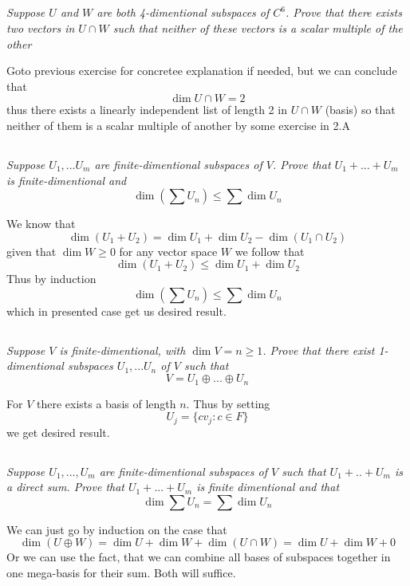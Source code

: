 \documentclass[11pt,oneside,titlepage]{book}
\begin{document}
\subsection{}
\textit{Suppose $U$ and $W$ are both 4-dimentional subspaces of $C^6$. Prove
  that there exists two vectors in $U \cap W$ such that neither of these
  vectors is a scalar multiple of the other}

Goto previous exercise for concretee explanation if needed, but  we can 
conclude that
$$\dim U \cap W = 2$$
thus there exists a linearly independent list of length 2 in $U \cap W$ (basis)
so that neither of them is a scalar multiple of another by some exercise in 2.A

\subsection{}
\textit{Suppose $U_1, ... U_m$ are finite-dimentional subspaces of $V$.
  Prove that $U_1 + ... + U_m$ is finite-dimentional and }
$$\dim(\sum U_n) \leq \sum{\dim U_n}$$

We know that 
$$\dim (U_1 + U_2) = \dim U_1 + \dim U_2 - \dim (U_1 \cap U_2)$$
given that $\dim W \geq 0$ for any vector space $W$ we follow that
$$\dim (U_1 + U_2) \leq \dim U_1 + \dim U_2$$
Thus by induction
$$\dim(\sum U_n) \leq  \sum \dim U_n $$
which in presented case get us desired result.

\subsection{}
\textit{Suppose $V$ is finite-dimentional, with $\dim V = n \geq 1$. Prove
  that there exist 1-dimentional subspaces $U_1, ... U_n$ of $V$ such that  
}
$$V = U_1 \oplus ... \oplus U_n$$

For $V$ there exists a basis of length $n$. Thus by setting
$$U_j = \{c v_j: c \in F\}$$
we get desired result.

\subsection{}
\textit{Suppose $U_1, ..., U_m$ are finite-dimentional subspaces of $V$ such
  that $U_1 + .. + U_m$ is a direct sum. Prove that $U_1 + ... + U_m$ is
  finite dimentional and that}
$$\dim \sum U_n = \sum \dim U_n$$

We can just go by induction on the case that
$$\dim (U \oplus W) = \dim U + \dim W + \dim (U \cap W) =
\dim U + \dim W + 0$$
Or we can use the fact, that we can combine all bases
of subspaces together in one
mega-basis for their sum. Both will suffice.
\end{document}
